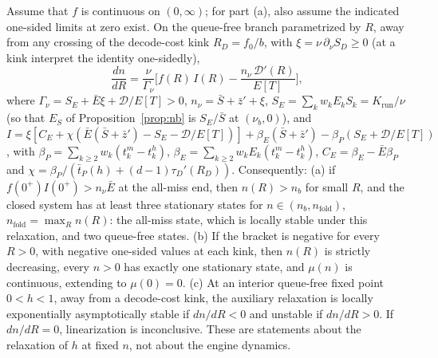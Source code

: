 \begin{proposition}\label{prop:fold}
Assume that $f$ is continuous on $(0,\infty)$; for part (a), also assume the indicated one-sided limits at zero exist. On the queue-free branch parametrized by $R$, away from any crossing of the decode-cost kink $R_D=f_0/b$, with $\xi=\nu\,\partial_\nu S_D\ge0$ (at a kink interpret the identity one-sidedly),
\[
\frac{dn}{dR}=\frac{\nu}{\Gamma_\nu}\Big[f(R)\,I(R)-\frac{n_\nu\,\mathcal D'(R)}{E[T]}\Big],
\]
where $\Gamma_\nu=S_E+\bar E\xi+\mathcal D/E[T]>0$, $n_\nu=\bar S+\bar z'+\xi$, $S_E=\sum_kw_kE_kS_k=K_{\mathrm{run}}/\nu$ (so that $E_S$ of Proposition~\ref{prop:nb} is $S_E/\bar S$ at $(\nu_b,0)$), and $I=\xi[C_E+\chi(\bar E(\bar S+\bar z')-S_E-\mathcal D/E[T])]+\beta_E(\bar S+\bar z')-\beta_P(S_E+\mathcal D/E[T])$, with $\beta_P=\sum_{k\ge2}w_k(t^m_k-t^h_k)$, $\beta_E=\sum_{k\ge2}w_kE_k(t^m_k-t^h_k)$, $C_E=\beta_E-\bar E\beta_P$ and $\chi=\beta_P/(\bar t_P(h)+(d-1)\tau_D'(R_D))$. Consequently:
(a) if $f(0^+)I(0^+)>n_\nu\bar E$ at the all-miss end, then $n(R)>n_b$ for small $R$, and the closed system has at least three stationary states for $n\in(n_b,n_{\mathrm{fold}})$, $n_{\mathrm{fold}}=\max_Rn(R)$: the all-miss state, which is locally stable under this relaxation, and two queue-free states.
(b) If the bracket is negative for every $R>0$, with negative one-sided values at each kink, then $n(R)$ is strictly decreasing, every $n>0$ has exactly one stationary state, and $\mu(n)$ is continuous, extending to $\mu(0)=0$.
(c) At an interior queue-free fixed point $0<h<1$, away from a decode-cost kink, the auxiliary relaxation is locally exponentially asymptotically stable if $dn/dR<0$ and unstable if $dn/dR>0$. If $dn/dR=0$, linearization is inconclusive. These are statements about the relaxation of $h$ at fixed $n$, not about the engine dynamics.
\end{proposition}

